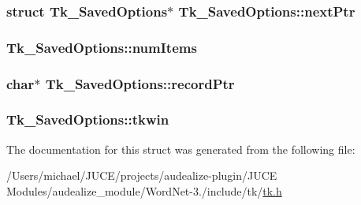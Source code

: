 \subsubsection[{\texorpdfstring{next\+Ptr}{nextPtr}}]{\setlength{\rightskip}{0pt plus 5cm}struct {\bf Tk\+\_\+\+Saved\+Options}$\ast$ Tk\+\_\+\+Saved\+Options\+::next\+Ptr}\hypertarget{struct_tk___saved_options_a7527bfee924e87d562d0c83877d3ea7e}{}\label{struct_tk___saved_options_a7527bfee924e87d562d0c83877d3ea7e}
\subsubsection[{\texorpdfstring{num\+Items}{numItems}}]{ Tk\+\_\+\+Saved\+Options\+::num\+Items}\hypertarget{struct_tk___saved_options_a101134ab8693f5b67b4313ab9e44e76d}{}\label{struct_tk___saved_options_a101134ab8693f5b67b4313ab9e44e76d}
\subsubsection[{\texorpdfstring{record\+Ptr}{recordPtr}}]{\setlength{\rightskip}{0pt plus 5cm}char$\ast$ Tk\+\_\+\+Saved\+Options\+::record\+Ptr}\hypertarget{struct_tk___saved_options_a7f2d523f73ed349fad480ebc3d56f00c}{}\label{struct_tk___saved_options_a7f2d523f73ed349fad480ebc3d56f00c}
\subsubsection[{\texorpdfstring{tkwin}{tkwin}}]{ Tk\+\_\+\+Saved\+Options\+::tkwin}\hypertarget{struct_tk___saved_options_a0464e3b345d3e7826c032a3e5711b754}{}\label{struct_tk___saved_options_a0464e3b345d3e7826c032a3e5711b754}


The documentation for this struct was generated from the following file\+:\begin{DoxyCompactItemize}
\item 
/\+Users/michael/\+J\+U\+C\+E/projects/audealize-\/plugin/\+J\+U\+C\+E Modules/audealize\+\_\+module/\+Word\+Net-\/3./include/tk/\hyperlink{tk_8h}{tk.\+h}\end{DoxyCompactItemize}
